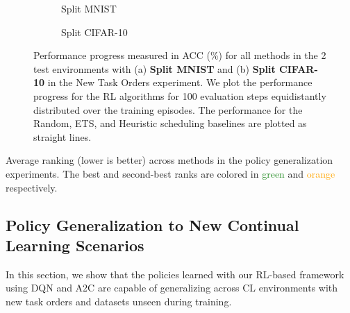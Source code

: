 \begin{figure}[t]
	\centering
	\setlength{\figwidth}{0.26\textwidth}
	\setlength{\figheight}{.14\textheight}
	\begin{subfigure}[t]{0.48\textwidth}
		\centering
		
		\vspace{-4mm} %
		\caption{Split MNIST}
		\label{fig:rewards_mnist_2envs}
	\end{subfigure}%
	\begin{subfigure}[t]{0.48\textwidth}
		\centering
		
		\caption{Split CIFAR-10}
		\label{fig:rewards_cifar10_2envs}
	\end{subfigure}
	\vspace{-2mm}
	\caption{Performance progress measured in ACC (\%) for all methods in the 2 test environments with (a) {\bf Split MNIST} and (b) {\bf Split CIFAR-10} in the New Task Orders experiment. We plot the performance progress for the RL algorithms for 100 evaluation steps equidistantly distributed over the training episodes. The performance for the Random, ETS, and Heuristic scheduling baselines are plotted as straight lines.  }
	\label{fig:rewards_new_task_orders_2envs}
	\vspace{-2mm}
\end{figure}


\begin{table}[t]
	\centering
	\caption{Average ranking (lower is better) across methods in the policy generalization experiments. The best and second-best ranks are colored in \textcolor{forestgreen}{green} and \textcolor{orange}{orange} respectively.}
	\vspace{-3mm}
	\resizebox{0.98\textwidth}{!}{
	
	}
	\label{tab:average_ranking_rl_experiment}
	\vspace{-3mm}
\end{table}


\subsection{Policy Generalization to New Continual Learning Scenarios}\label{paperD:sec:results_on_policy_generalization}

In this section, we show that the policies learned with our RL-based framework using DQN and A2C are capable of generalizing across CL environments with new task orders and datasets unseen during training. 


